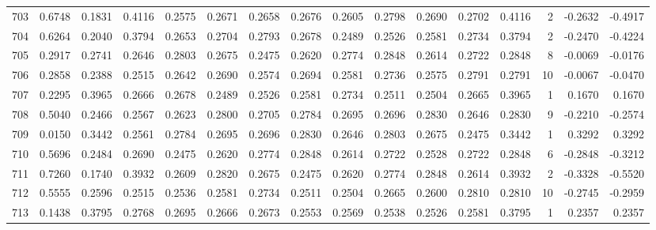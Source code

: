 \begin{tabular}{lrrrrrrrrrrrrrrr}
703 &      0.6748 &  0.1831 &  0.4116 &  0.2575 &  0.2671 &  0.2658 &  0.2676 &  0.2605 &  0.2798 &  0.2690 &   0.2702 &     0.4116 &      2 &                   -0.2632 &                    -0.4917 \\
704 &      0.6264 &  0.2040 &  0.3794 &  0.2653 &  0.2704 &  0.2793 &  0.2678 &  0.2489 &  0.2526 &  0.2581 &   0.2734 &     0.3794 &      2 &                   -0.2470 &                    -0.4224 \\
705 &      0.2917 &  0.2741 &  0.2646 &  0.2803 &  0.2675 &  0.2475 &  0.2620 &  0.2774 &  0.2848 &  0.2614 &   0.2722 &     0.2848 &      8 &                   -0.0069 &                    -0.0176 \\
706 &      0.2858 &  0.2388 &  0.2515 &  0.2642 &  0.2690 &  0.2574 &  0.2694 &  0.2581 &  0.2736 &  0.2575 &   0.2791 &     0.2791 &     10 &                   -0.0067 &                    -0.0470 \\
707 &      0.2295 &  0.3965 &  0.2666 &  0.2678 &  0.2489 &  0.2526 &  0.2581 &  0.2734 &  0.2511 &  0.2504 &   0.2665 &     0.3965 &      1 &                    0.1670 &                     0.1670 \\
708 &      0.5040 &  0.2466 &  0.2567 &  0.2623 &  0.2800 &  0.2705 &  0.2784 &  0.2695 &  0.2696 &  0.2830 &   0.2646 &     0.2830 &      9 &                   -0.2210 &                    -0.2574 \\
709 &      0.0150 &  0.3442 &  0.2561 &  0.2784 &  0.2695 &  0.2696 &  0.2830 &  0.2646 &  0.2803 &  0.2675 &   0.2475 &     0.3442 &      1 &                    0.3292 &                     0.3292 \\
710 &      0.5696 &  0.2484 &  0.2690 &  0.2475 &  0.2620 &  0.2774 &  0.2848 &  0.2614 &  0.2722 &  0.2528 &   0.2722 &     0.2848 &      6 &                   -0.2848 &                    -0.3212 \\
711 &      0.7260 &  0.1740 &  0.3932 &  0.2609 &  0.2820 &  0.2675 &  0.2475 &  0.2620 &  0.2774 &  0.2848 &   0.2614 &     0.3932 &      2 &                   -0.3328 &                    -0.5520 \\
712 &      0.5555 &  0.2596 &  0.2515 &  0.2536 &  0.2581 &  0.2734 &  0.2511 &  0.2504 &  0.2665 &  0.2600 &   0.2810 &     0.2810 &     10 &                   -0.2745 &                    -0.2959 \\
713 &      0.1438 &  0.3795 &  0.2768 &  0.2695 &  0.2666 &  0.2673 &  0.2553 &  0.2569 &  0.2538 &  0.2526 &   0.2581 &     0.3795 &      1 &                    0.2357 &                     0.2357 \\

\end{tabular}
